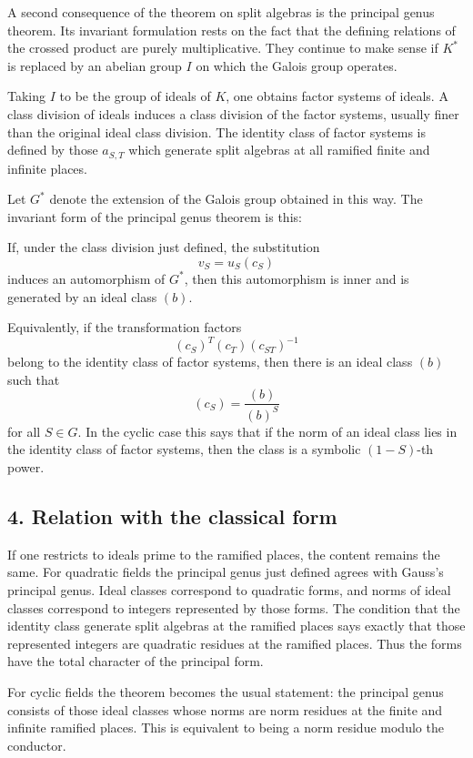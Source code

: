 \documentclass[11pt]{article}
\begin{document}
A second consequence of the theorem on split algebras is the principal
genus theorem. Its invariant formulation rests on the fact that the
defining relations of the crossed product are purely multiplicative.
They continue to make sense if \(K^*\) is replaced by an abelian group
\(I\) on which the Galois group operates.

Taking \(I\) to be the group of ideals of \(K\), one obtains factor
systems of ideals. A class division of ideals induces a class division
of the factor systems, usually finer than the original ideal class
division. The identity class of factor systems is defined by those
\(a_{S,T}\) which generate split algebras at all ramified finite and
infinite places.

Let \(G^*\) denote the extension of the Galois group obtained in this
way. The invariant form of the principal genus theorem is this:

If, under the class division just defined, the substitution \[
  v_S=u_S(c_S)
\] induces an automorphism of \(G^*\), then this automorphism is inner
and is generated by an ideal class \((b)\).

Equivalently, if the transformation factors \[
  (c_S)^T(c_T)(c_{ST})^{-1}
\] belong to the identity class of factor systems, then there is an
ideal class \((b)\) such that \[
  (c_S)=\frac{(b)}{(b)^S}
\] for all \(S\in G\). In the cyclic case this says that if the norm of
an ideal class lies in the identity class of factor systems, then the
class is a symbolic \((1-S)\)-th power.

\subsection{4. Relation with the classical
form}\label{relation-with-the-classical-form}

If one restricts to ideals prime to the ramified places, the content
remains the same. For quadratic fields the principal genus just defined
agrees with Gauss's principal genus. Ideal classes correspond to
quadratic forms, and norms of ideal classes correspond to integers
represented by those forms. The condition that the identity class
generate split algebras at the ramified places says exactly that those
represented integers are quadratic residues at the ramified places. Thus
the forms have the total character of the principal form.

For cyclic fields the theorem becomes the usual statement: the principal
genus consists of those ideal classes whose norms are norm residues at
the finite and infinite ramified places. This is equivalent to being a
norm residue modulo the conductor.
\end{document}
